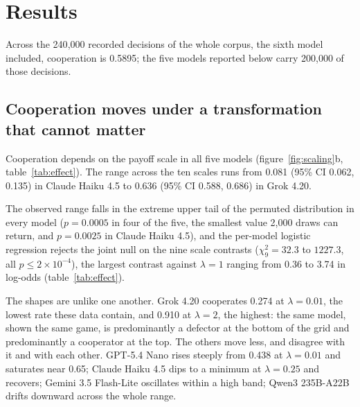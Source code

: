 \documentclass[11pt,a4paper]{article}
\newcommand{\lam}{\lambda}
\newcommand{\ci}[2]{(95\% CI #1, #2)}
\begin{document}
%
%
%

\section{Results}
\label{sec:results}

Across the 240{,}000 recorded decisions of the whole corpus, the sixth model
included, cooperation is 0.5895; the five models reported below carry 200{,}000
of those decisions.

\subsection{Cooperation moves under a transformation that cannot matter}

Cooperation depends on the payoff scale in all five models
(figure~\ref{fig:scaling}b, table~\ref{tab:effect}). The range across the ten
scales runs from 0.081 \ci{0.062}{0.135} in Claude Haiku 4.5 to 0.636
\ci{0.588}{0.686} in Grok 4.20.

The observed range falls in the extreme upper tail of the permuted distribution
in every model ($p = 0.0005$ in four of the five, the smallest value 2{,}000
draws can return, and $p = 0.0025$ in Claude Haiku 4.5), and the per-model
logistic regression rejects the joint null on the nine scale contrasts
($\chi^2_9 = 32.3$ to $1227.3$, all $p \leq 2\times10^{-4}$), the largest
contrast against $\lam = 1$ ranging from 0.36 to 3.74 in log-odds
(table~\ref{tab:effect}).

The shapes are unlike one another. Grok 4.20 cooperates 0.274 at $\lam = 0.01$,
the lowest rate these data contain, and 0.910 at $\lam = 2$, the highest: the
same model, shown the same game, is predominantly a defector at the bottom of
the grid and predominantly a cooperator at the top. The others move less, and
disagree with it and with each other. GPT-5.4 Nano rises steeply from 0.438 at
$\lam = 0.01$ and saturates near 0.65; Claude Haiku 4.5 dips to a minimum at
$\lam = 0.25$ and recovers; Gemini 3.5 Flash-Lite oscillates within a high band;
Qwen3 235B-A22B drifts downward across the whole range.
\end{document}
